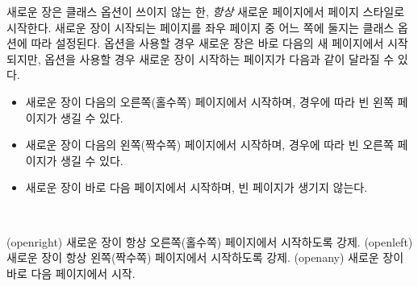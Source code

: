 새로운 장은  클래스 옵션이 쓰이지 않는 한,
\emph{항상} 새로운 페이지에서  페이지 스타일로 시작한다.
새로운 장이 시작되는 페이지를 좌우 페이지 중 어느 쪽에 둘지는 클래스 옵션에 따라 설정된다.
 옵션을 사용할 경우 새로운 장은 바로 다음의 새 페이지에서 시작되지만,
 옵션을 사용할 경우 새로운 장이 시작하는 페이지가 다음과 같이 달라질 수 있다.

\begin{itemize}
	\item[\Lopt{openright}] 새로운 장이 다음의 오른쪽(홀수쪽) 페이지에서 시작하며,
	경우에 따라 빈 왼쪽 페이지가 생길 수 있다.
	\item[\Lopt{openleft}] 새로운 장이 다음의 왼쪽(짝수쪽) 페이지에서 시작하며,
	경우에 따라 빈 오른쪽 페이지가 생길 수 있다.
	\item[\Lopt{openany}] 새로운 장이 바로 다음 페이지에서 시작하며,
	빈 페이지가 생기지 않는다.
\end{itemize}

\begin{syntax}
\cmd{\openright} \cmd{\openleft} \cmd{\openany} \\
\end{syntax}
\glossary(openright)%
  {}%
  {새로운 장이 항상 오른쪽(홀수쪽) 페이지에서 시작하도록 강제.}
\glossary(openleft)%
  {}%
  {새로운 장이 항상 왼쪽(짝수쪽) 페이지에서 시작하도록 강제.}
\glossary(openany)%
  {}%
  {새로운 장이 바로 다음 페이지에서 시작.}
  
